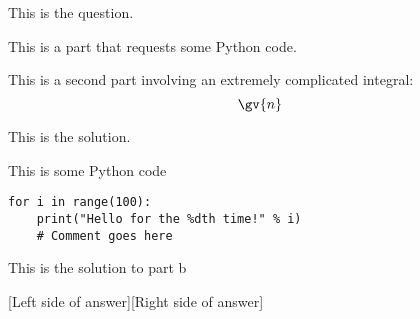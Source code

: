 
This is the question.
\begin{alpQ}
	\item This is a part that requests some Python code.
	\item This is a second part involving an extremely complicated integral: \[\gv{n}\]
\end{alpQ}

\midsep

\begin{solution}

	This is the solution.
	\begin{alpQ}
		\item This is some Python code
		\begin{lstlisting}[style=Python]
for i in range(100):
	print("Hello for the %dth time!" % i)
	# Comment goes here
		\end{lstlisting}
		\item This is the solution to part b

		[Left side of answer][Right side of answer]

	\end{alpQ}

\end{solution}